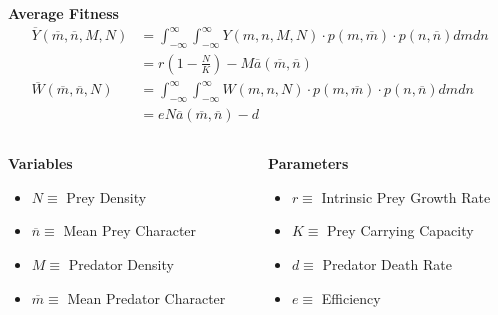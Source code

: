 \documentclass[10pt]{beamer}
\begin{document}
\begin{frame}
	\frametitle{}
	{\bf Average Fitness}
	\begin{align*}
	\overline{Y}(\overline{m}, \overline{n}, M, N) &= \int_{-\infty}^{\infty}\int_{-\infty}^{\infty} Y(m, n, M, N) \cdot p(m, \overline{m}) \cdot p(n, \overline{n}) dm dn \\
	&= r\left(1 - \frac{N}{K}\right) - M\overline{a}(\overline{m}, \overline{n}) \\[.1cm]
	\overline{W}(\overline{m}, \overline{n}, N) &= \int_{-\infty}^{\infty}\int_{-\infty}^{\infty} W(m, n, N) \cdot p(m, \overline{m}) \cdot p(n, \overline{n}) dm dn \\
	&= eN\overline{a}(\overline{m}, \overline{n}) - d
	\end{align*}
	\begin{columns}
		\begin{column}{0.5\textwidth}
			{\bf Variables}
			\begin{itemize}
				\item $N \equiv $ Prey Density
				\item $\overline{n} \equiv $ Mean Prey Character
				\item $M \equiv $ Predator Density
				\item $\overline{m} \equiv $ Mean Predator Character
			\end{itemize}
		\end{column}
		\begin{column}{0.5\textwidth}
			{\bf Parameters}
			\begin{itemize}
				\item $r \equiv $ Intrinsic Prey Growth Rate
				\item $K \equiv $ Prey Carrying Capacity
				\item $d \equiv $ Predator Death Rate
				\item $e \equiv $ Efficiency
			\end{itemize}
		\end{column}
	\end{columns}
\end{frame}
\end{document}
